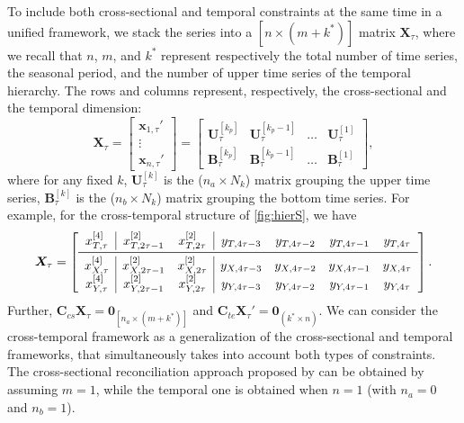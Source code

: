 \documentclass[a4paper,11pt]{article}
\newcommand{\xvet}{\bm{x}}
\newcommand{\Bvet}{\bm{B}}
\newcommand{\Cvet}{\bm{C}}
\newcommand{\Uvet}{\bm{U}}
\newcommand{\Xvet}{\bm{X}}
\newcommand{\Zerovet}{\bm{0}}
\theoremstyle{definition}
\begin{document}
To include both cross-sectional and temporal constraints at the same time in a unified framework, we stack the series into a $[n \times (m+k^\ast)]$ matrix $\Xvet_\tau$, where we recall that $n$, $m$, and $k^*$ represent respectively the total number of time series, the seasonal period, and the number of upper time series of the temporal hierarchy. The rows and columns represent, respectively, the cross-sectional and the temporal dimension:
$$
	\Xvet_\tau = \begin{bmatrix}
		\xvet_{1,\tau}' \\[-0.1cm]
		\vdots          \\[-0.2cm]
		\xvet_{n,\tau}'
	\end{bmatrix} = \begin{bmatrix}
	\Uvet_{\tau}^{[k_p]} & \Uvet_{\tau}^{[k_p-1]} & \dots & \Uvet_{\tau}^{[1]}\\[0.25cm]
	\Bvet_{\tau}^{[k_p]} & \Bvet_{\tau}^{[k_p-1]} & \dots & \Bvet_{\tau}^{[1]}
	\end{bmatrix},
$$
where for any fixed $k$,
$\Uvet_{\tau}^{[k]}$ is the ($n_a\times N_k$) matrix grouping the upper time series, $\Bvet_{\tau}^{[k]}$ is the ($n_b\times N_k$) matrix grouping the bottom time series. For example, for the cross-temporal structure of \autoref{fig:hierS}, we have
$$
\Xvet_\tau = \left[\begin{array}{c|cc|cccc}
x^{[4]}_{T,\tau} & x^{[2]}_{T,2\tau-1} & x^{[2]}_{T,2\tau} & y_{T,4\tau-3} & y_{T,4\tau-2} & y_{T,4\tau-1} & y_{T,4\tau}\\
\midrule
x^{[4]}_{X,\tau} & x^{[2]}_{X,2\tau-1} & x^{[2]}_{X,2\tau} & y_{X,4\tau-3} & y_{X,4\tau-2} & y_{X,4\tau-1} & y_{X,4\tau}\\
x^{[4]}_{Y,\tau} & x^{[2]}_{Y,2\tau-1} & x^{[2]}_{Y,2\tau} & y_{Y,4\tau-3} & y_{Y,4\tau-2} & y_{Y,4\tau-1} & y_{Y,4\tau}\\
\end{array}\right].
$$
Further, $\Cvet_{cs}\Xvet_\tau = \Zerovet_{\left[n_a \times (m+k^\ast)\right]}$ and $\Cvet_{te}\Xvet_\tau' = \Zerovet_{(k^\ast \times n)} $. We can consider the cross-temporal framework as a generalization of the cross-sectional and temporal frameworks, that simultaneously takes into account both types of constraints. The cross-sectional reconciliation approach proposed by \cite{hyndman2011} can be obtained by assuming $m = 1$, while the temporal one \citep{athanasopoulos2017} is obtained when $n = 1$ (with $n_a = 0$ and $n_b = 1$).


\end{document}
